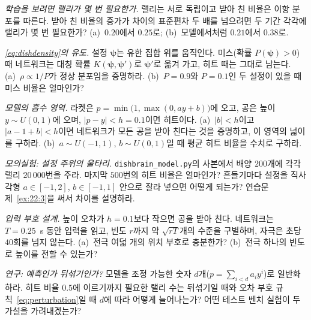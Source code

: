 \begin{exercise}[\lvlA]
\label{ex:22:2}
\emph{학습을 보려면 랠리가 몇 번 필요한가.} 랠리는 서로 독립이고 받아 친 비율은 이항 분포를 따른다. 받아 친 비율의 증가가 차이의 표준편차 두 배를 넘으려면 두 기간 각각에 랠리가 몇 번 필요한가? (a)~$0.20$에서 $0.25$로; (b)~모델에서처럼 $0.21$에서 $0.38$로.
\end{exercise}

\begin{exercise}[\lvlB]
\label{ex:22:3}
\emph{\eqref{eq:dishdensity}의 유도.} 설정 $\boldsymbol\psi$는 유한 집합 위를 움직인다. 미스(확률 $P(\boldsymbol\psi)>0$) 때 네트워크는 대칭 확률 $K(\boldsymbol\psi,\boldsymbol\psi')$로 $\boldsymbol\psi'$로 옮겨 가고, 히트 때는 그대로 남는다. (a)~$\rho\propto1/P$가 정상 분포임을 증명하라. (b)~$P=0.9$와 $P=0.1$인 두 설정이 있을 때 미스 비율은 얼마인가?
\end{exercise}

\begin{exercise}[\lvlB]
\label{ex:22:4}
\emph{모델의 흡수 영역.} 라켓은 $p=\min\bigl(1,\max(0,ay+b)\bigr)$에 오고, 공은 높이 $y\sim U(0,1)$에 오며, $|p-y|<h=0.1$이면 히트이다. (a)~$|b|<h$이고 $|a-1+b|<h$이면 네트워크가 모든 공을 받아 친다는 것을 증명하고, 이 영역의 넓이를 구하라. (b)~$a\sim U(-1,1)$, $b\sim U(0,1)$일 때 평균 히트 비율을 수치로 구하라.
\end{exercise}

\begin{exercise}[\lvlB]
\label{ex:22:5}
\emph{모의실험: 설정 주위의 울타리.} \texttt{dishbrain\_model.py}의 사본에서 배양 $200$개에 각각 랠리 $20\,000$번을 주라. 마지막 $500$번의 히트 비율은 얼마인가? 흔들기마다 설정을 직사각형 $a\in[-1,2]$, $b\in[-1,1]$ 안으로 잘라 넣으면 어떻게 되는가? 연습문제~\ref{ex:22:3}을 써서 차이를 설명하라.
\end{exercise}

\begin{exercise}[\lvlB]
\label{ex:22:6}
\emph{입력 부호 설계.} 높이 오차가 $h=0.1$보다 작으면 공을 받아 친다. 네트워크는 $T=0.25$~s 동안 입력을 읽고, 빈도 $r$까지 약 $\sqrt{rT}$개의 수준을 구별하며, 자극은 초당 $40$회를 넘지 않는다. (a)~전극 여덟 개의 위치 부호로 충분한가? (b)~전극 하나의 빈도로 높이를 전할 수 있는가?
\end{exercise}

\begin{exercise}[\lvlC]
\label{ex:22:7}
\emph{연구: 예측인가 뒤섞기인가?} 모델을 조정 가능한 숫자 $d$개($p=\sum_{i<d}a_iy^i$)로 일반화하라. 히트 비율 $0.5$에 이르기까지 필요한 랠리 수는 뒤섞기일 때와 오차 부호 규칙~\eqref{eq:perturbation}일 때 $d$에 따라 어떻게 늘어나는가? 어떤 테스트 벤치 실험이 두 가설을 가려내겠는가?
\end{exercise}
